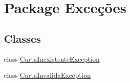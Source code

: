 \hypertarget{namespace_exce_xC3_xA7_xC3_xB5es}{
\section{\-Package \-Exceções}
\label{namespace_exce_xC3_xA7_xC3_xB5es}
}
\subsection*{\-Classes}
\begin{DoxyCompactItemize}
\item 
class \hyperlink{class_exce_xC3_xA7_xC3_xB5es_1_1_carta_inexistente_exception}{\-Carta\-Inexistente\-Exception}
\item 
class \hyperlink{class_exce_xC3_xA7_xC3_xB5es_1_1_carta_invalida_exception}{\-Carta\-Invalida\-Exception}
\end{DoxyCompactItemize}
